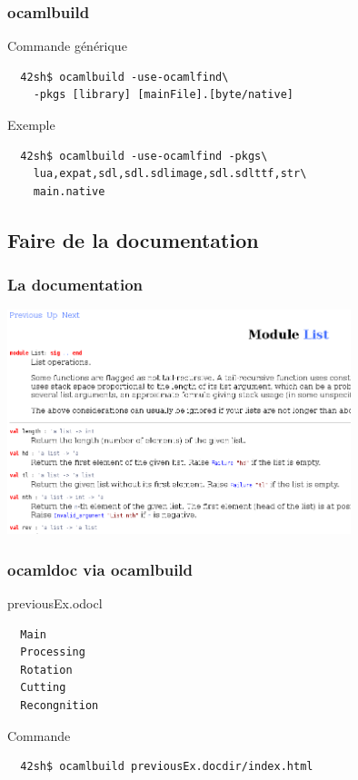 \begin{frame}[fragile]
	\frametitle{ocamlbuild}
	\begin{block}{Commande générique}
		\begin{lstlisting}
  42sh$ ocamlbuild -use-ocamlfind\
    -pkgs [library] [mainFile].[byte/native]
		\end{lstlisting}
	\end{block}
	\begin{block}{Exemple}
		\begin{lstlisting}
  42sh$ ocamlbuild -use-ocamlfind -pkgs\
    lua,expat,sdl,sdl.sdlimage,sdl.sdlttf,str\
    main.native
		\end{lstlisting}
	\end{block}
\end{frame}

\subsection{Faire de la documentation} %
\begin{frame}
	\frametitle{La documentation}
	\begin{center}
		\includegraphics[width=10cm]{pics/doc.png}
	\end{center}
\end{frame}

\begin{frame}[fragile]
	\frametitle{ocamldoc via ocamlbuild}
	\begin{block}{previousEx.odocl}
		\begin{lstlisting}
  Main
  Processing
  Rotation
  Cutting
  Recongnition
		\end{lstlisting}
	\end{block}
	\begin{block}{Commande}
		\begin{lstlisting}
  42sh$ ocamlbuild previousEx.docdir/index.html
		\end{lstlisting}
	\end{block}
\end{frame}

